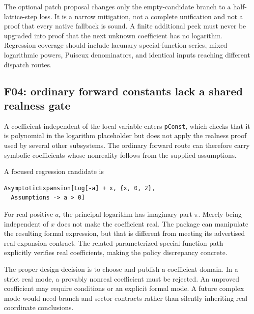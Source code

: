 The optional patch proposal changes only the empty-candidate branch to a half-lattice-step loss. It is a narrow mitigation, not a complete unification and not a proof that every native fallback is sound. A finite additional peek must never be upgraded into proof that the next unknown coefficient has no logarithm. Regression coverage should include lacunary special-function series, mixed logarithmic powers, Puiseux denominators, and identical inputs reaching different dispatch routes.

\subsection{F04: ordinary forward constants lack a shared realness gate}
\label{sec:f04}


\cite{core,arithmetic,parameterized}

A coefficient independent of the local variable enters \texttt{pConst}, which checks that it is polynomial in the logarithm placeholder but does not apply the realness proof used by several other subsystems. The ordinary forward route can therefore carry symbolic coefficients whose nonreality follows from the supplied assumptions.

A focused regression candidate is
\begin{lstlisting}
AsymptoticExpansion[Log[-a] + x, {x, 0, 2},
  Assumptions -> a > 0]
\end{lstlisting}
For real positive $a$, the principal logarithm has imaginary part $\pi$. Merely being independent of $x$ does not make the coefficient real. The package can manipulate the resulting formal expression, but that is different from meeting its advertised real-expansion contract. The related parameterized-special-function path explicitly verifies real coefficients, making the policy discrepancy concrete.

The proper design decision is to choose and publish a coefficient domain. In a strict real mode, a provably nonreal coefficient must be rejected. An unproved coefficient may require conditions or an explicit formal mode. A future complex mode would need branch and sector contracts rather than silently inheriting real-coordinate conclusions.

